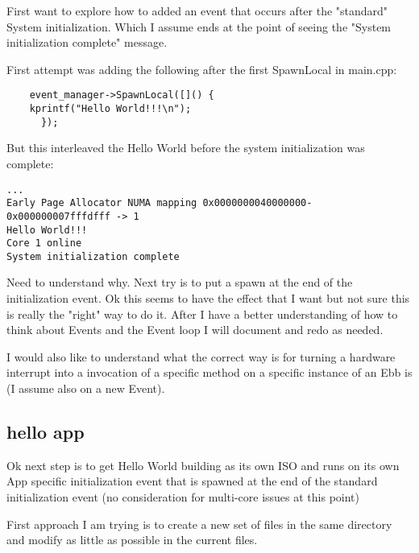 \documentclass[11pt]{report}
\begin{document}
First want to explore how to added an event that occurs after
the "standard" System initialization.  Which I assume ends
at the point of seeing the "System initialization complete" message.

First attempt was adding the following after the first SpawnLocal in main.cpp:
\begin{verbatim}
    event_manager->SpawnLocal([]() {
	kprintf("Hello World!!!\n");
      });
\end{verbatim}

But this interleaved the Hello World before the system initialization was complete:
\begin{verbatim}
...
Early Page Allocator NUMA mapping 0x0000000040000000-0x000000007fffdfff -> 1
Hello World!!!
Core 1 online
System initialization complete
\end{verbatim}

Need to understand why.
Next try is to put a spawn at the end of the initialization event.
Ok this seems to have the effect that I want but not sure this is really 
the "right" way to do it.  After I have a better understanding of how to 
think about Events and the Event loop I will document and redo as needed.

I would also like to understand what the correct way is for turning a hardware
interrupt into a invocation of a specific method on a specific instance of an Ebb is (I assume also on a new Event).

\subsection{hello app}
Ok next step is to get Hello World building as its own ISO and runs
on its own App specific initialization event that is spawned at the 
end of the standard initialization event (no consideration for 
multi-core issues at this point)

First approach I am trying is to create a new set of files in the same
directory and modify as little as possible in the current files.
\end{document}
